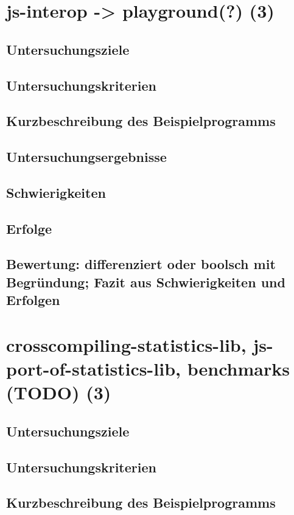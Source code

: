 \documentclass[a4paper, 12pt, listof=totoc, bibliography=totoc]{scrreprt}
\begin{document}
\section{js-interop -> playground(?) (3)}

\subsection{Untersuchungsziele}
\subsection{Untersuchungskriterien}
\subsection{Kurzbeschreibung des Beispielprogramms}
\subsection{Untersuchungsergebnisse}
\subsection{Schwierigkeiten}
\subsection{Erfolge}
\subsection{Bewertung: differenziert oder boolsch mit Begründung; Fazit aus Schwierigkeiten und Erfolgen}

\section{crosscompiling-statistics-lib, js-port-of-statistics-lib, benchmarks (TODO) (3)}

\subsection{Untersuchungsziele}
\subsection{Untersuchungskriterien}
\subsection{Kurzbeschreibung des Beispielprogramms}
\end{document}
